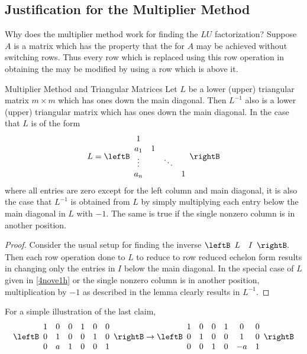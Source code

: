 \subsection{Justification for the  Multiplier Method}

Why does the multiplier method work for finding the $LU$ factorization?
Suppose $A$ is a matrix which has the property that the \ef\; for $A$ may be achieved without switching rows. Thus every row which is replaced using this
row operation in obtaining the \ef\; may be modified by using a row which
is above it.

\begin{lemma}{Multiplier Method and Triangular Matrices}\label{lem:multipliermethodtriangularmatrices}
Let $L$ be a lower (upper) triangular matrix $m\times m$
which has ones down the main diagonal. Then $L^{-1}$ also is a lower (upper)
triangular matrix which has ones down the main diagonal. In the case that $L$
is of the form 
\begin{equation}
L=\leftB 
\begin{array}{cccc}
1 &  &  &  \\ 
a_{1} & 1 &  &  \\ 
\vdots &  & \ddots &  \\ 
a_{n} &  &  & 1
\end{array}
\rightB  \label{4nove1h}
\end{equation}
where all entries are zero except for the left column and main diagonal, it
is also the case that $L^{-1}$ is obtained from $L$ by simply multiplying
each entry below the main diagonal in $L$ with $-1$. The same is true if the
single nonzero column is in another position.
\end{lemma}

\begin{proof}Consider the usual setup for finding the inverse $\leftB 
\begin{array}{cc}
L & I
\end{array}
\rightB .$ Then each row operation done to $L$ to reduce to row reduced
echelon form results in changing only the entries in $I$ below the main
diagonal. In the special case of $L$ given in \ref{4nove1h} or the single
nonzero column is in another position, multiplication by $-1$ as described
in the lemma clearly results in $L^{-1}$.
\end{proof}

For a simple illustration of the last claim, 
\begin{equation*}
\leftB 
\begin{array}{cccccc}
1 & 0 & 0 & 1 & 0 & 0 \\ 
0 & 1 & 0 & 0 & 1 & 0 \\ 
0 & a & 1 & 0 & 0 & 1
\end{array}
\rightB \rightarrow \leftB 
\begin{array}{cccccc}
1 & 0 & 0 & 1 & 0 & 0 \\ 
0 & 1 & 0 & 0 & 1 & 0 \\ 
0 & 0 & 1 & 0 & -a & 1%
\end{array}%
\rightB
\end{equation*}

